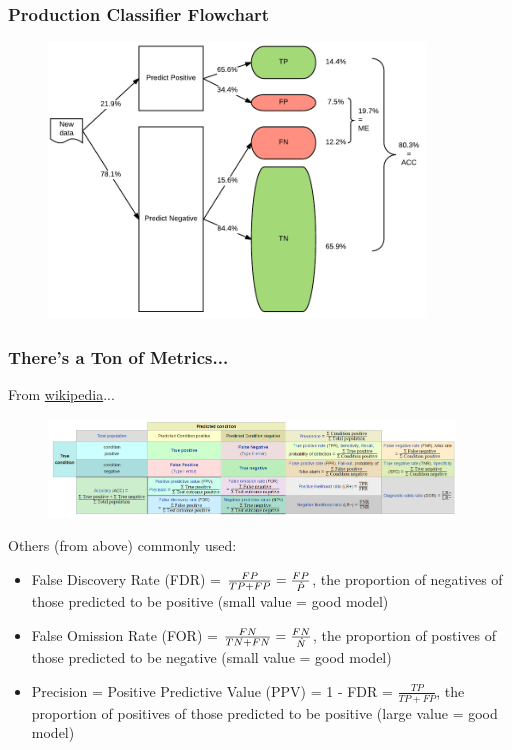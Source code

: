 \documentclass[handout]{beamer}
\begin{document}
\begin{frame}\frametitle{Production Classifier Flowchart}
\begin{figure}
\centering
\includegraphics[width=3.95in]{classifier_flowchart}
\end{figure}
\end{frame}


\begin{frame}\frametitle{There's a Ton of Metrics...}

From \href{https://en.wikipedia.org/wiki/Confusion\_matrix\#Table\_of\_confusion}{wikipedia}... 

\begin{figure}
\centering
\hspace{-0.5cm}\includegraphics[width=4.25in]{confusion_matrix.png}
\end{figure}

\footnotesize
Others (from above) commonly used:

\begin{itemize} \footnotesize
\item False Discovery Rate (FDR) = $\frac{FP}{TP + FP} = \frac{FP}{\hat{P}}$, the proportion of negatives of those predicted to be positive (small value = good model) \pause
\item False Omission Rate (FOR) = $\frac{FN}{TN + FN} = \frac{FN}{\hat{N}}$, the proportion of postives of those predicted to be negative (small value = good model) \pause
\item Precision = Positive Predictive Value (PPV) = 1 - FDR = $\frac{TP}{TP + FP}$, the proportion of positives of those predicted to be positive (large value = good model)
\end{itemize}
	
\end{frame}
\end{document}
